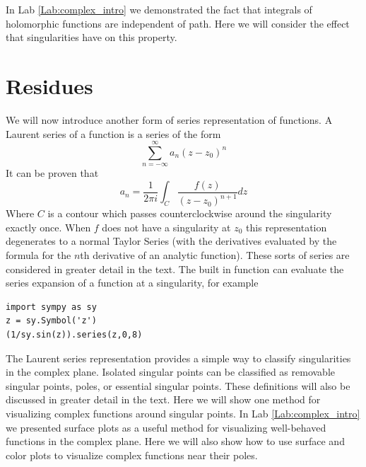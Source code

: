 

In Lab \ref{Lab:complex_intro} we demonstrated the fact that integrals of holomorphic functions are independent of path.
Here we will consider the effect that singularities have on this property.

\section*{Residues}

We will now introduce another form of series representation of functions.
A Laurent series of a function is a series of the form
\[\sum_{n= -\infty}^{\infty} a_n (z-z_0)^n\]
It can be proven that
\[a_n = \frac{1}{2\pi i} \int_C \frac{f(z)}{(z-z_0)^{n+1}} dz\]
Where $C$ is a contour which passes counterclockwise around the singularity exactly once.
When $f$ does not have a singularity at $z_0$ this representation degenerates to a normal Taylor Series (with the derivatives evaluated by the formula for the $n$th derivative of an analytic function).
These sorts of series are considered in greater detail in the text.
The built in function  can evaluate the series expansion of a function at a singularity, for example
\begin{lstlisting}
import sympy as sy
z = sy.Symbol('z')
(1/sy.sin(z)).series(z,0,8)
\end{lstlisting}

The Laurent series representation provides a simple way to classify singularities in the complex plane.
Isolated singular points can be classified as removable singular points, poles, or essential singular points.
These definitions will also be discussed in greater detail in the text.
Here we will show one method for visualizing complex functions around singular points.
In Lab \ref{Lab:complex_intro} we presented surface plots as a useful method for visualizing well-behaved functions in the complex plane.
Here we will also show how to use surface and color plots to visualize complex functions near their poles.


